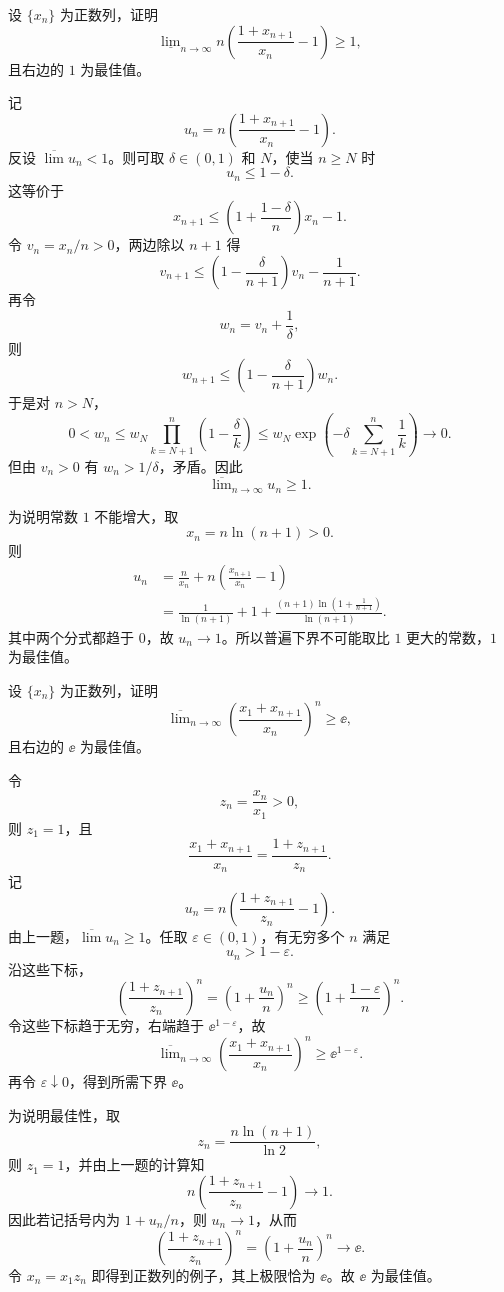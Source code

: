 \begin{xreferenceproblem}[9]
设 $\{x_n\}$ 为正数列，证明
  \[
    \underline{\lim}_{n\to\infty}n\left(\frac{1+x_{n+1}}{x_n}-1\right)\geqslant1,
  \]
  且右边的 $1$ 为最佳值。
\end{xreferenceproblem}
\begin{xsolution}
记
\[
  u_n=n\left(\frac{1+x_{n+1}}{x_n}-1\right).
\]
反设 $\overline{\lim}u_n<1$。则可取 $\delta\in(0,1)$ 和 $N$，使当 $n\geqslant N$ 时
\[
  u_n\leqslant1-\delta.
\]
这等价于
\[
  x_{n+1}\leqslant
  \left(1+\frac{1-\delta}{n}\right)x_n-1.
\]
令 $v_n=x_n/n>0$，两边除以 $n+1$ 得
\[
  v_{n+1}
  \leqslant
  \left(1-\frac{\delta}{n+1}\right)v_n-\frac1{n+1}.
\]
再令
\[
  w_n=v_n+\frac1\delta,
\]
则
\[
  w_{n+1}\leqslant
  \left(1-\frac{\delta}{n+1}\right)w_n.
\]
于是对 $n>N$，
\[
  0<w_n
  \leqslant w_N\prod_{k=N+1}^{n}\left(1-\frac\delta k\right)
  \leqslant w_N\exp\left(-\delta\sum_{k=N+1}^{n}\frac1k\right)
  \longrightarrow0.
\]
但由 $v_n>0$ 有 $w_n>1/\delta$，矛盾。因此
\[
  \overline{\lim}_{n\to\infty}u_n\geqslant1.
\]

为说明常数 $1$ 不能增大，取
\[
  x_n=n\ln(n+1)>0.
\]
则
\begin{align*}
  u_n
  &=\frac{n}{x_n}+n\left(\frac{x_{n+1}}{x_n}-1\right)\\
  &=\frac1{\ln(n+1)}
    +1+
    \frac{(n+1)\ln\left(1+\frac1{n+1}\right)}{\ln(n+1)}.
\end{align*}
其中两个分式都趋于 $0$，故 $u_n\to1$。所以普遍下界不可能取比 $1$ 更大的常数，$1$ 为最佳值。
\end{xsolution}


\begin{xreferenceproblem}[10]
设 $\{x_n\}$ 为正数列，证明
  \[
    \overline{\lim}_{n\to\infty}\left(\frac{x_1+x_{n+1}}{x_n}\right)^n\geqslant\ee,
  \]
  且右边的 $\ee$ 为最佳值。
\end{xreferenceproblem}
\begin{xsolution}
令
\[
  z_n=\frac{x_n}{x_1}>0,
\]
则 $z_1=1$，且
\[
  \frac{x_1+x_{n+1}}{x_n}
  =\frac{1+z_{n+1}}{z_n}.
\]
记
\[
  u_n=n\left(\frac{1+z_{n+1}}{z_n}-1\right).
\]
由上一题，$\overline{\lim}u_n\geqslant1$。任取 $\varepsilon\in(0,1)$，有无穷多个 $n$ 满足
\[
  u_n>1-\varepsilon.
\]
沿这些下标，
\[
  \left(\frac{1+z_{n+1}}{z_n}\right)^n
  =\left(1+\frac{u_n}{n}\right)^n
  \geqslant
  \left(1+\frac{1-\varepsilon}{n}\right)^n.
\]
令这些下标趋于无穷，右端趋于 $\ee^{1-\varepsilon}$，故
\[
  \overline{\lim}_{n\to\infty}
  \left(\frac{x_1+x_{n+1}}{x_n}\right)^n
  \geqslant\ee^{1-\varepsilon}.
\]
再令 $\varepsilon\downarrow0$，得到所需下界 $\ee$。

为说明最佳性，取
\[
  z_n=\frac{n\ln(n+1)}{\ln2},
\]
则 $z_1=1$，并由上一题的计算知
\[
  n\left(\frac{1+z_{n+1}}{z_n}-1\right)\to1.
\]
因此若记括号内为 $1+u_n/n$，则 $u_n\to1$，从而
\[
  \left(\frac{1+z_{n+1}}{z_n}\right)^n
  =\left(1+\frac{u_n}{n}\right)^n\to\ee.
\]
令 $x_n=x_1z_n$ 即得到正数列的例子，其上极限恰为 $\ee$。故 $\ee$ 为最佳值。
\end{xsolution}


